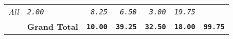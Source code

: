 \documentclass[11pt,A4paper,]{article}
\begin{document}
\begin{longtable}[]{@{}llrrrrr@{}}
\begin{minipage}[t]{0.14\columnwidth}
\emph{All}\strut
\end{minipage} & \begin{minipage}[t]{0.14\columnwidth}\raggedleft\strut
\emph{\texttt{2.00}}\strut
\end{minipage} & \begin{minipage}[t]{0.14\columnwidth}\raggedleft\strut
\emph{\texttt{8.25}}\strut
\end{minipage} & \begin{minipage}[t]{0.14\columnwidth}\raggedleft\strut
\emph{\texttt{6.50}}\strut
\end{minipage} & \begin{minipage}[t]{0.14\columnwidth}\raggedleft\strut
\emph{\texttt{3.00}}\strut
\end{minipage} & \begin{minipage}[t]{0.14\columnwidth}\raggedleft\strut
\emph{\texttt{19.75}}\strut
\end{minipage}\tabularnewline
\begin{minipage}[t]{0.14\columnwidth}\raggedright\strut
\strut
\end{minipage} & \begin{minipage}[t]{0.14\columnwidth}\raggedright\strut
\textbf{Grand Total}\strut
\end{minipage} & \begin{minipage}[t]{0.14\columnwidth}\raggedleft\strut
\textbf{\texttt{10.00}}\strut
\end{minipage} & \begin{minipage}[t]{0.14\columnwidth}\raggedleft\strut
\textbf{\texttt{39.25}}\strut
\end{minipage} & \begin{minipage}[t]{0.14\columnwidth}\raggedleft\strut
\textbf{\texttt{32.50}}\strut
\end{minipage} & \begin{minipage}[t]{0.14\columnwidth}\raggedleft\strut
\textbf{\texttt{18.00}}\strut
\end{minipage} & \begin{minipage}[t]{0.14\columnwidth}\raggedleft\strut
\textbf{\texttt{99.75}}\strut
\end{minipage}\tabularnewline
\bottomrule
\end{longtable}
\end{document}
